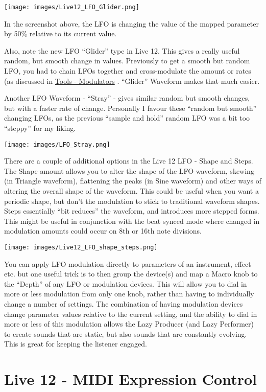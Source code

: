 \documentclass[
  12pt,
  letterpaper,
  oneside,
  open=any]{scrbook}
\begin{document}
\texttt{[image: images/Live12\_LFO\_Glider.png]}

In the screenshot above, the LFO is changing the value of the mapped
parameter by 50\% relative to its current value.

Also, note the new LFO ``Glider'' type in Live 12. This gives a really
useful random, but smooth change in values. Previously to get a smooth
but random LFO, you had to chain LFOs together and cross-modulate the
amount or rates (as discussed in
\hyperref[Chapter-007-Tools-Modulators]{Tools - Modulators} . ``Glider''
Waveform makes that much easier.

Another LFO Waveform - ``Stray'' - gives similar random but smooth
changes, but with a faster rate of change. Personally I favour these
``random but smooth'' changing LFOs, as the previous ``sample and hold''
random LFO was a bit too ``steppy'' for my liking.

\texttt{[image: images/LFO\_Stray.png]}

There are a couple of additional options in the Live 12 LFO - Shape and
Steps. The Shape amount allows you to alter the shape of the LFO
waveform, skewing (in Triangle waveform), flattening the peaks (in Sine
waveform) and other ways of altering the overall shape of the waveform.
This could be useful when you want a periodic shape, but don't the
modulation to stick to traditional waveform shapes. Steps essentially
``bit reduces'' the waveform, and introduces more stepped forms. This
might be useful in conjunction with the beat synced mode where changed
in modulation amounts could occur on 8th or 16th note divisions.

\texttt{[image: images/Live12\_LFO\_shape\_steps.png]}

You can apply LFO modulation directly to parameters of an instrument,
effect etc. but one useful trick is to then group the device(s) and map
a Macro knob to the ``Depth'' of any LFO or modulation devices. This
will allow you to dial in more or less modulation from only one knob,
rather than having to individually change a number of settings. The
combination of having modulation devices change parameter values
relative to the current setting, and the ability to dial in more or less
of this modulation allows the Lazy Producer (and Lazy Performer) to
create sounds that are static, but also sounds that are constantly
evolving. This is great for keeping the listener engaged.

\section{Live 12 - MIDI Expression
Control}\label{live-12---midi-expression-control}
\end{document}
